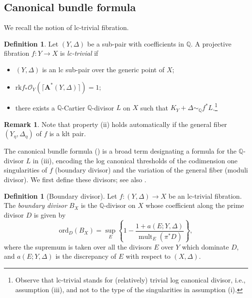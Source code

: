 \documentclass{amsart}
\newcommand{\rar}{\rightarrow}
\def\O#1.{\mathcal {O}_{#1}}
\def\K#1.{K_{#1}}
\theoremstyle{definition}
\newtheorem{definition}[theorem]{Definition}
\newtheorem{remark}[theorem]{Remark}
\newtheorem{defn}[theorem]{Definition}
\theoremstyle{remark}
\def\bQ{\mathbb{Q}}
\numberwithin{equation}{section}
\begin{document}
\subsection{Canonical bundle formula}\label{sec:cbf}
We recall the notion of lc-trivial fibration.
\begin{definition} 
\label{lc-trivial.def}
Let $(Y, \Delta)$ be a sub-pair with coefficients in $\bQ$.
A projective fibration $f \colon Y \rar X$ 
is \emph{lc-trivial} if
\begin{itemize}
    \item[(i)]\label{lc-trivial-cond1} $(Y,\Delta)$ is an lc sub-pair over the 
    generic point of $X$;
    \item[(ii)]\label{lc-trivial-cond2} $\mathrm{rk} f_\ast  \O Y. 
    (\lceil \mathbf{A}^\ast (Y,\Delta)\rceil)=1$;
    \item[(iii)]\label{lc-trivial-cond3} there exists a $\bQ$-Cartier $\bQ$-divisor $L$ on $X$
    such that $\K Y. + \Delta \sim_\bQ f^\ast  
    L$.\footnote{Observe that lc-trivial stands for (relatively) 
    trivial log canonical divisor, i.e., assumption (iii), and not 
    to the type of the singularities in assumption (i).} 
\end{itemize}
\end{definition}

\begin{remark}
Note that property (ii) holds automatically if the general fiber $(Y_{\eta}, \Delta_{\eta})$ of $f$ is a klt pair.
\end{remark}

The canonical bundle formula () is a broad
term designating a formula for the $\bQ$-divisor
$L$ in (iii),
encoding the log canonical thresholds of the codimension one singularities of $f$ (boundary divisor) and the variation of the general fiber (moduli divisor). We first define these divisors; see also \cite{AmbroPhD, Amb04, Amb05, FG14, Koll07}.

\begin{defn}[Boundary divisor]\label{defn:boundary}
Let $f \colon (Y, \Delta) \to X$ be an lc-trivial fibration. 
The {\emph{boundary divisor}} $B_X$ is the $\bQ$-divisor on $X$ whose coefficient along the prime divisor $D$ is given by
 \[
 \mathrm{ord}_{D}(B_X)=\sup_E\left\lbrace 1-\frac{1+a(E; Y, \Delta)}{\operatorname{mult}_E(\pi^*D)}\right\rbrace,
\]
 where the supremum is taken over all the divisors $E$ over $Y$ which dominate $D$, and $a(E; Y, \Delta)$ is the discrepancy of $E$ with respect to $(X, \Delta)$.
 \end{defn}
\end{document}
